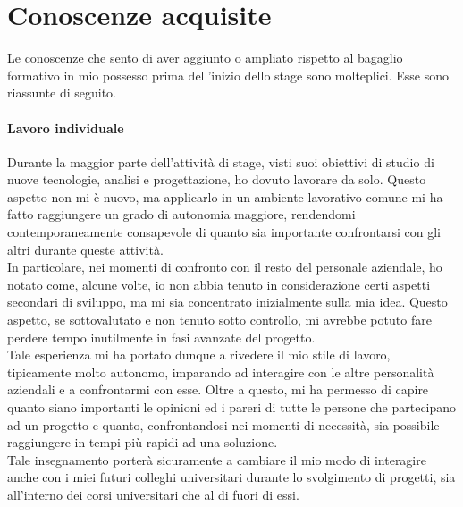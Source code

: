 \section{Conoscenze acquisite}
Le conoscenze che sento di aver aggiunto o ampliato rispetto al bagaglio formativo in mio possesso prima dell'inizio dello stage sono molteplici. Esse sono riassunte di seguito.

\paragraph{Lavoro individuale}
Durante la maggior parte dell'attività di stage, visti suoi obiettivi di studio di nuove tecnologie, analisi e progettazione, ho dovuto lavorare da solo. Questo aspetto non mi è nuovo, ma applicarlo in un ambiente lavorativo comune mi ha fatto raggiungere un grado di autonomia maggiore, rendendomi contemporaneamente consapevole di quanto sia importante confrontarsi con gli altri durante queste attività. \\
In particolare, nei momenti di confronto con il resto del personale aziendale, ho notato come, alcune volte, io non abbia tenuto in considerazione certi aspetti secondari di sviluppo, ma mi sia concentrato inizialmente sulla mia idea. Questo aspetto, se sottovalutato e non tenuto sotto controllo, mi avrebbe potuto fare perdere tempo inutilmente in fasi avanzate del progetto.\\
Tale esperienza mi ha portato dunque a rivedere il mio stile di lavoro, tipicamente molto autonomo, imparando ad interagire con le altre personalità aziendali e a confrontarmi con esse. Oltre a questo, mi ha permesso di capire quanto siano importanti le opinioni ed i pareri di tutte le persone che partecipano ad un progetto e quanto, confrontandosi nei momenti di necessità, sia possibile raggiungere in tempi più rapidi ad una soluzione. \\
Tale insegnamento porterà sicuramente a cambiare il mio modo di interagire anche con i miei futuri colleghi universitari durante lo svolgimento di progetti, sia all'interno dei corsi universitari che al di fuori di essi.

